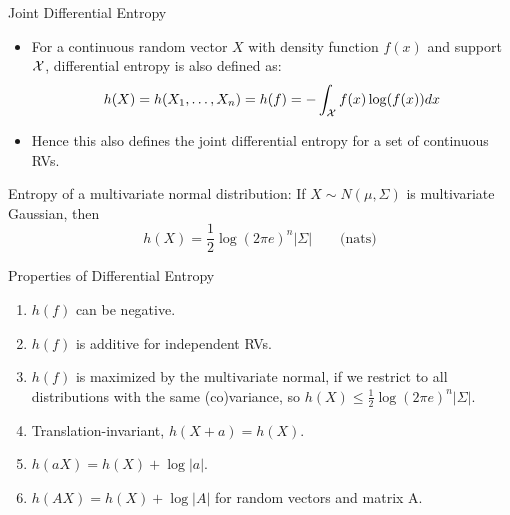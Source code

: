 \begin{vbframe}{Joint Differential Entropy} 
\begin{itemize}
\item For a continuous random vector $X$ with density function $f(x)$ and support $\mathcal{X}$, 
  differential entropy is also defined as:
$$ h(X) = h(X_1, \ldots, X_n) = h(f) = - \int_{\mathcal{X}} f(x) \log(f(x)) dx $$
\item Hence this also defines the joint differential entropy for a set of continuous RVs.
\end{itemize}

\lz
  
Entropy of a multivariate normal distribution: 
If $X \sim N(\mu, \Sigma)$ is multivariate Gaussian, then
  $$h(X) = \frac{1}{2} \log(2 \pi e)^n |\Sigma| \qquad \text{(nats)}$$
\end{vbframe}

\begin{vbframe}{Properties of Differential Entropy} 
\begin{enumerate}
  \item $h(f)$ can be negative.
  \item $h(f)$ is additive for independent RVs.
  \item $h(f)$ is maximized by the multivariate normal, if we restrict 
    to all distributions with the same (co)variance, so
    $h(X) \leq \frac{1}{2} \log(2 \pi e)^n |\Sigma|.$
\item Translation-invariant, $ h(X+a) = h(X)$. 
\item $h(aX) = h(X) + \log |a|$.
\item $h(AX) = h(X) + \log |A|$ for random vectors and matrix A.
\end{enumerate}
\end{vbframe}

\endlecture

